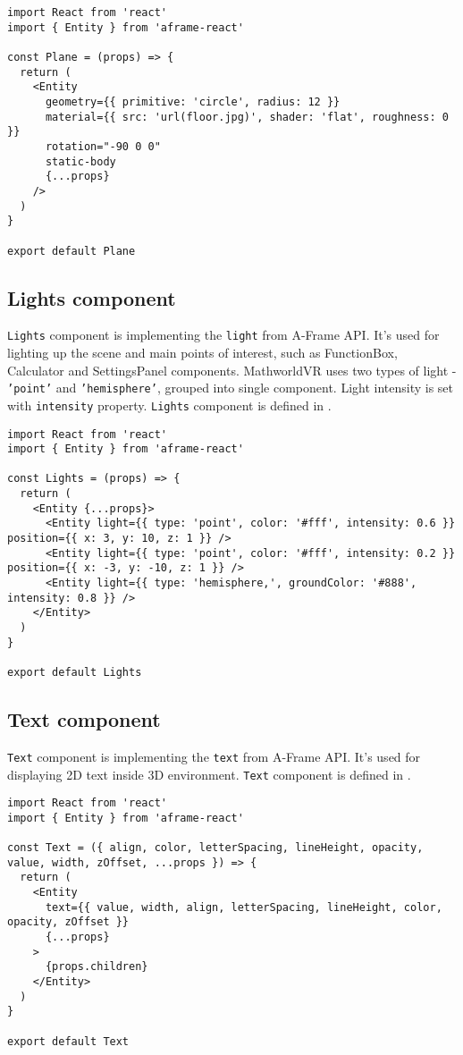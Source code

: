 \begin{lstlisting}[caption={\textsl{Plane} component code.},captionpos=b]
import React from 'react'
import { Entity } from 'aframe-react'

const Plane = (props) => {
  return (
    <Entity
      geometry={{ primitive: 'circle', radius: 12 }}
      material={{ src: 'url(floor.jpg)', shader: 'flat', roughness: 0 }}
      rotation="-90 0 0"
      static-body
      {...props}
    />
  )
}

export default Plane
\end{lstlisting}

\subsection{Lights component}
\texttt{Lights} component is implementing the \texttt{light} from A-Frame API. It's used for lighting up the scene and main points of interest, such as FunctionBox, Calculator and SettingsPanel components. MathworldVR uses two types of light - \texttt{'point'} and \texttt{'hemisphere'}, grouped into single component. Light intensity is set with \texttt{intensity} property. \texttt{Lights} component is defined in .

\begin{lstlisting}[caption={\textsl{Lights} component code.},captionpos=b]
import React from 'react'
import { Entity } from 'aframe-react'

const Lights = (props) => {
  return (
    <Entity {...props}>
      <Entity light={{ type: 'point', color: '#fff', intensity: 0.6 }} position={{ x: 3, y: 10, z: 1 }} />
      <Entity light={{ type: 'point', color: '#fff', intensity: 0.2 }} position={{ x: -3, y: -10, z: 1 }} />
      <Entity light={{ type: 'hemisphere,', groundColor: '#888', intensity: 0.8 }} />
    </Entity>
  )
}

export default Lights
\end{lstlisting}

\subsection{Text component}
\texttt{Text} component is implementing the \texttt{text} from A-Frame API. It's used for displaying 2D text inside 3D environment. \texttt{Text} component is defined in .

\begin{lstlisting}[caption={\textsl{Lights} component code.},captionpos=b]
import React from 'react'
import { Entity } from 'aframe-react'

const Text = ({ align, color, letterSpacing, lineHeight, opacity, value, width, zOffset, ...props }) => {
  return (
    <Entity
      text={{ value, width, align, letterSpacing, lineHeight, color, opacity, zOffset }}
      {...props}
    >
      {props.children}
    </Entity>
  )
}

export default Text
\end{lstlisting}

